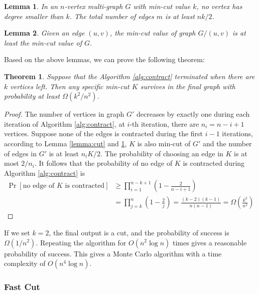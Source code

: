\documentclass[11pt]{article}
\theoremstyle{plain}
\newtheorem{lemma}{Lemma}[section]
\newtheorem{theorem}{Theorem}[section]
\begin{document}
\begin{lemma}
    \label{lemma:degree}
    In an $n$-vertex multi-graph $G$ with min-cut value $k$, no vertex has degree smaller than $k$. The total number of edges $m$ is at least $nk/2$.
\end{lemma}

\begin{lemma}
    \label{lemma:contract}
    Given an edge $(u,v)$, the min-cut value of graph $G/(u,v)$ is at least the min-cut value of $G$.
\end{lemma}

Based on the above lemmas, we can prove the following theorem:

\begin{theorem}
    \label{theorem:contract}
    Suppose that the Algorithm \ref{alg:contract} terminated when there are $k$ vertices left. Then any specific min-cut $K$ survives in the final graph with probability at least $\Omega(k^2/n^2)$.
\end{theorem}
\begin{proof}
    The number of vertices in graph $G'$ decreases by exactly one during each iteration of Algorithm \ref{alg:contract}, at $i$-th iteration, there are $n_i=n-i+1$ vertices. Suppose none of the edges is contracted during the first $i-1$ iterations, according to Lemma \ref{lemma:cut} and \ref{lemma:degree}, $K$ is also min-cut of $G'$ and the number of edges in $G'$ is at least $n_iK/2$. The probability of choosing an edge in $K$ is at most $2/n_i$. It follows that the probability of no edge of $K$ is contracted during Algorithm \ref{alg:contract} is
\begin{align*}
    \Pr[\text{no edge of }K\text{ is contracted}]&\ge\prod_{i=1}^{n-k+1}\left(1-\frac{2}{n-i+1}\right)\\
    &=\prod_{j=k}^n\left(1-\frac{2}{j}\right)=\frac{(k-2)(k-1)}{n(n-1)}=\Omega\left(\frac{k^2}{n^2}\right)
\end{align*}
\end{proof}


If we set $k=2$, the final output is a cut, and the probability of success is $\Omega(1/n^2)$. Repeating the algorithm for $O(n^2\log n)$ times gives a reasonable probability of success. This gives a Monte Carlo algorithm with a time complexity of $O(n^4\log n)$.

\subsubsection{Fast Cut}\
\end{document}
